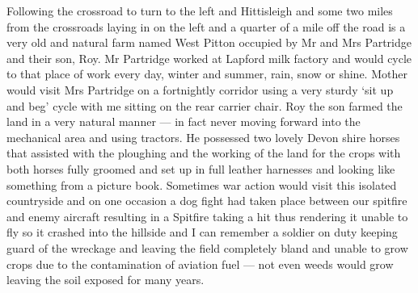 Following the crossroad to turn to the left and Hittisleigh and some two miles
from the crossroads laying in on the left and a quarter of a mile off the road
is a very old and natural farm named West Pitton occupied by Mr and Mrs
Partridge and their son, Roy. Mr Partridge worked at Lapford milk factory and
would cycle to that place of work every day, winter and summer, rain, snow or
shine. Mother would visit Mrs Partridge on a fortnightly corridor using a very
sturdy ‘sit up and beg' cycle with me sitting on the rear carrier chair. Roy
the son farmed the land in a very natural manner --- in fact never moving forward
into the mechanical area and using tractors. He possessed two lovely Devon
shire horses that assisted with the ploughing and the working of the land for
the crops with both horses fully groomed and set up in full leather harnesses
and looking like something from a picture book. Sometimes war action would
visit this isolated countryside and on one occasion a dog fight had taken place
between our spitfire and enemy aircraft resulting in a Spitfire taking a hit
thus rendering it unable to fly so it crashed into the hillside and I can
remember a soldier on duty keeping guard of the wreckage and leaving the field
completely bland and unable to grow crops due to the contamination of aviation
fuel --- not even weeds would grow leaving the soil exposed for many years.

